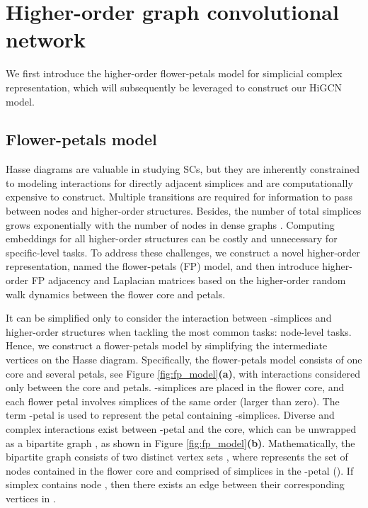 \documentclass[letterpaper]{article} \usepackage{aaai24}
\theoremstyle{plain}
\theoremstyle{definition}
\theoremstyle{remark}
\begin{document}
\section{Higher-order graph convolutional network}

We first introduce the higher-order flower-petals model for simplicial complex representation, which will subsequently be leveraged to construct our HiGCN model.



\subsection{Flower-petals model}
Hasse diagrams are valuable in studying SCs, but they are inherently constrained to modeling interactions for directly adjacent simplices and are computationally expensive to construct. Multiple transitions are required for information to pass between nodes and higher-order structures.
Besides, the number of total simplices grows exponentially with the number of nodes in dense graphs \cite{maxClique1999}.
Computing embeddings for all higher-order structures can be costly and unnecessary for specific-level tasks. 
To address these challenges, we construct a novel higher-order representation, named the flower-petals (FP) model, and then introduce higher-order FP adjacency and Laplacian matrices based on the higher-order random walk dynamics between the flower core and petals.




It can be simplified only to consider the interaction between -simplices and higher-order structures when tackling the most common tasks: node-level tasks.
Hence, we construct a flower-petals model by simplifying the intermediate vertices on the Hasse diagram. 
Specifically, the flower-petals model consists of one core and several petals, see Figure \ref{fig:fp_model}\textbf{(a)}, with interactions considered only between the core and petals. 
-simplices are placed in the flower core, and each flower petal involves simplices of the same order (larger than zero).
The term -petal is used to represent the petal containing -simplices.
Diverse and complex interactions exist between -petal and the core, which can be unwrapped as a bipartite graph , as shown in Figure \ref{fig:fp_model}\textbf{(b)}. 
Mathematically, the bipartite graph  consists of two distinct vertex sets , where  represents the set of nodes contained in the flower core and  comprised of simplices in the -petal (). If simplex  contains node , then there exists an edge between their corresponding vertices in .
\end{document}
